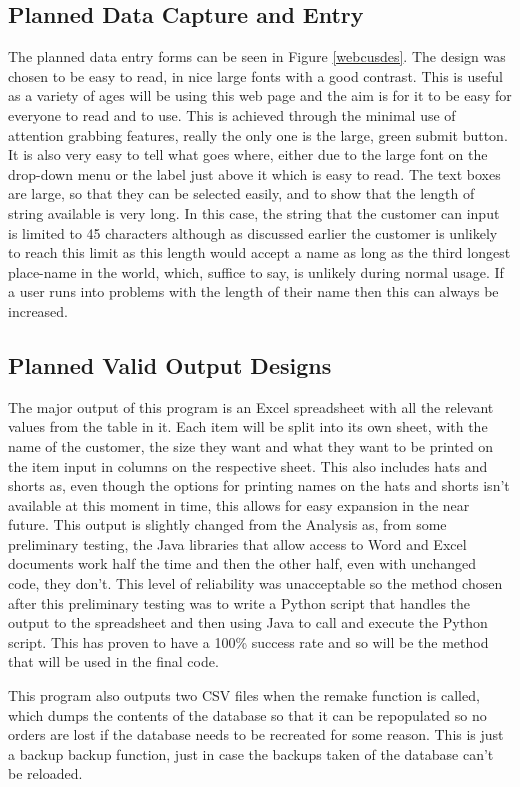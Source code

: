 \documentclass[
11pt, %
a4paper, %
oneside, %
headinclude,footinclude, %
BCOR5mm, %
]{scrartcl}
\begin{document}
\subsection{Planned Data Capture and Entry}
	The planned data entry forms can be seen in Figure \ref{webcusdes}. The design was chosen to be easy to read, in nice large fonts with a good contrast. This is useful as a variety of ages will be using this web page and the aim is for it to be easy for everyone to read and to use. This is achieved through the minimal use of attention grabbing features, really the only one is the large, green submit button. It is also very easy to tell what goes where, either due to the large font on the drop-down menu or the label just above it which is easy to read. The text boxes are large, so that they can be selected easily, and to show that the length of string available is very long. In this case, the string that the customer can input is  limited to 45 characters although as discussed earlier the customer is unlikely to reach this limit as this length would accept a name as long as the third longest place-name in the world, which, suffice to say, is unlikely during normal usage. If a user runs into problems with the length of their name then this can always be increased. 
\subsection{Planned Valid Output Designs}
	The major output of this program is an Excel spreadsheet with all the relevant values from the table in it. Each item will be split into its own sheet, with the name of the customer, the size they want and what they want to be printed on the item input in columns on the respective sheet. This also includes hats and shorts as, even though the options for printing names on the hats and shorts isn't available at this moment in time, this allows for easy expansion in the near future. This output is slightly changed from the Analysis as, from some preliminary testing, the Java libraries that allow access to Word and Excel documents work half the time and then the other half, even with unchanged code, they don't. This level of reliability was unacceptable so the method chosen after this preliminary testing was to write a Python script that handles the output to the spreadsheet and then using Java to call and execute the Python script. This has proven to have a 100\% success rate and so will be the method that will be used in the final code.\par This program also outputs two CSV files when the remake function is called, which dumps the contents of the database so that it can be repopulated so no orders are lost if the database needs to be recreated for some reason. This is just a backup backup function, just in case the backups taken of the database can't be reloaded.
\end{document}

